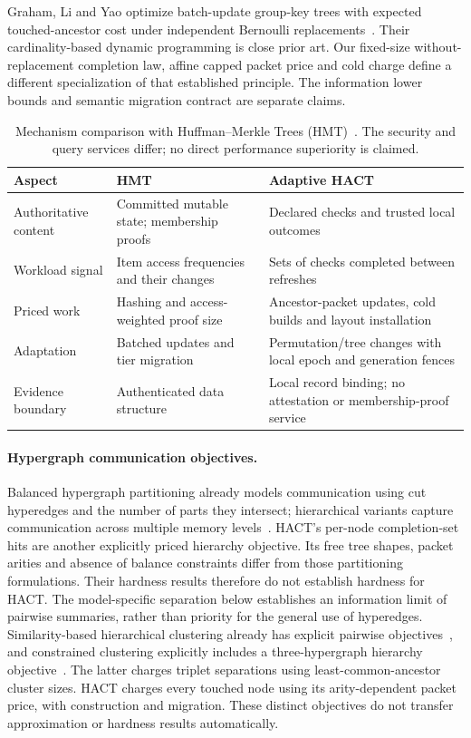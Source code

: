 \documentclass[11pt]{article}
\theoremstyle{definition}\newtheorem{definition}[theorem]{Definition}
\begin{document}
Graham, Li and Yao optimize batch-update group-key trees with expected
touched-ancestor cost under independent Bernoulli replacements~\cite{graham2007}.
Their cardinality-based dynamic programming is close prior art. Our
fixed-size without-replacement completion law, affine capped packet price
and cold charge define a different specialization of that established
principle. The information lower bounds and semantic migration contract
are separate claims.

\begin{table}[t]\centering\small
\caption{Mechanism comparison with Huffman--Merkle Trees (HMT)~\cite{hmt}.
The security and query services differ; no direct performance superiority is claimed.}
\begin{tabularx}{\linewidth}{@{}p{.19\linewidth}XX@{}}\toprule
Aspect & HMT & Adaptive HACT\\\midrule
Authoritative content & Committed mutable state; membership proofs & Declared checks and trusted local outcomes\\
Workload signal & Item access frequencies and their changes & Sets of checks completed between refreshes\\
Priced work & Hashing and access-weighted proof size & Ancestor-packet updates, cold builds and layout installation\\
Adaptation & Batched updates and tier migration & Permutation/tree changes with local epoch and generation fences\\
Evidence boundary & Authenticated data structure & Local record binding; no attestation or membership-proof service\\\bottomrule
\end{tabularx}
\end{table}

\paragraph{Hypergraph communication objectives.}
Balanced hypergraph partitioning already models communication using cut
hyperedges and the number of parts they intersect; hierarchical variants
capture communication across multiple memory levels~\cite{hyperpartition}.
HACT's per-node completion-set hits are another explicitly priced hierarchy
objective. Its free tree shapes, packet arities and absence of balance
constraints differ from those partitioning formulations. Their hardness
results therefore do not establish hardness for HACT. The model-specific
separation below establishes an information limit of pairwise summaries,
rather than priority for the general use of hyperedges. Similarity-based
hierarchical clustering already has explicit pairwise objectives~\cite{dasgupta},
and constrained clustering explicitly includes a three-hypergraph hierarchy
objective~\cite{hyperhierarchy}. The latter charges triplet separations
using least-common-ancestor cluster sizes. HACT charges every touched node
using its arity-dependent packet price, with construction and migration.
These distinct objectives do not transfer approximation or hardness results
automatically.
\end{document}

